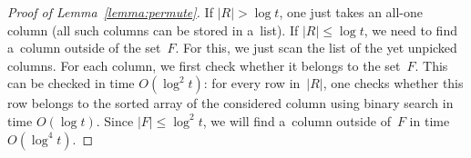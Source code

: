 \begin{proof}[Proof of Lemma~\ref{lemma:permute}]
If $|R| > \log t$, one just takes an all-one column (all such columns
can be stored in a~list). If $|R| \le \log t$, we need to find a~column outside
of the set~$F$. For this, we just scan the list of the yet unpicked columns. For
each column, we first check whether it belongs to the set~$F$. This can be
checked in time $O(\log^2t)$: for every row in~$|R|$, one checks whether this
row belongs to the sorted array of the considered column using binary search in
time $O(\log t)$. Since $|F| \le \log^2t$, we will find a~column outside of~$F$
in time~$O(\log^4 t)$.

\end{proof}

